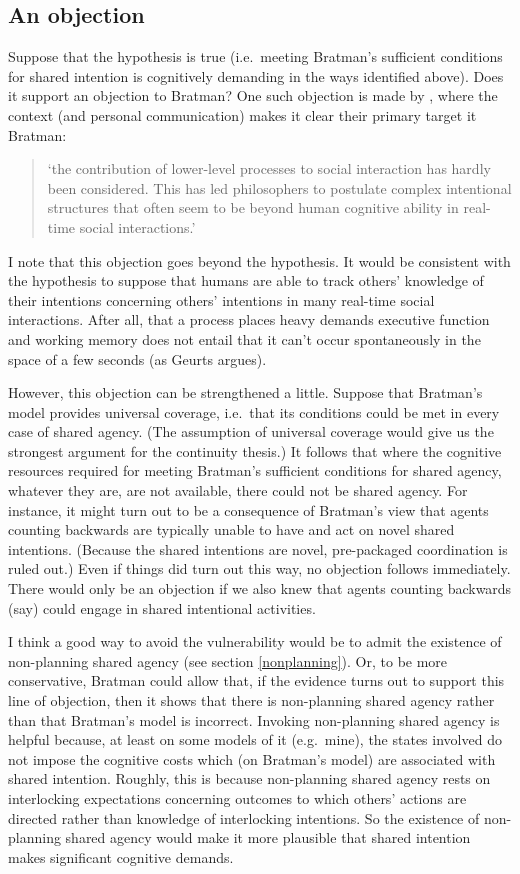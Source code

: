 \documentclass[12pt,letterpaper]{extarticle}
\begin{document}
\subsection{An objection}
Suppose that the hypothesis is true (i.e.\ meeting Bratman's sufficient conditions for shared intention is cognitively demanding in the ways identified above).
Does it support an objection to Bratman?
One such objection is made by \citet[p.\ 2022]{Knoblich:2008hy}, where the context (and personal communication) makes it clear their primary target it Bratman: 
%
\begin{quote}
`the contribution of lower-level processes to social interaction has hardly been considered. This has led philosophers to postulate complex intentional structures that often seem to be beyond human cognitive ability in real-time social interactions.'
\end{quote} 
%
I note that this objection goes beyond the hypothesis.
It would be consistent with the hypothesis to suppose that humans are able to track others' knowledge of their intentions concerning others' intentions in many real-time social interactions.
After all, that a process places heavy demands executive function and working memory does not entail that it can't occur spontaneously in the space of a few seconds (as Geurts argues).

However, this objection can be strengthened a little.
Suppose that Bratman's model provides universal coverage, i.e.\ that its conditions could be met in every case of shared agency.
(The assumption of universal coverage would give us the strongest argument for the continuity thesis.)
It follows that where the cognitive resources required for meeting Bratman's sufficient conditions for shared agency, whatever they are, are not available, there could not be shared agency.
For instance, it might turn out to be a consequence of Bratman's view that agents counting backwards are typically unable to have and act on novel shared intentions.  
(Because the shared intentions are novel, pre-packaged coordination is ruled out.)
Even if things did turn out this way, no objection follows immediately.
There would only be an objection if we also knew that agents counting backwards (say) could engage in shared intentional activities.

I think a good way to avoid the vulnerability would be to admit the existence of non-planning shared agency (see section \vref{nonplanning}).
Or, to be  more conservative, Bratman could allow that, if the evidence turns out to support this line of objection, then it shows that there is non-planning shared agency rather than that Bratman's model is incorrect.
Invoking non-planning shared agency is helpful because, at least on some models of it (e.g.\ mine), the states involved do not impose the cognitive costs which (on Bratman's model) are associated with shared intention.
Roughly, this is because non-planning shared agency rests on interlocking expectations concerning outcomes to which others' actions are directed rather than knowledge of interlocking intentions.
So the existence of non-planning shared agency would make it more plausible that shared intention makes significant cognitive demands.
\end{document}
